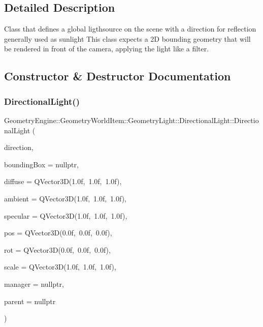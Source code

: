 \subsection{Detailed Description}
Class that defines a global ligthsource on the scene with a direction for reflection generally used as sunlight This class expects a 2D bounding geometry that will be rendered in front of the camera, applying the light like a filter. 

\subsection{Constructor \& Destructor Documentation}
\mbox{\label{class_geometry_engine_1_1_geometry_world_item_1_1_geometry_light_1_1_directional_light_ac85f53b0abb002ec8406755b9177cf53}} 
\subsubsection{\texorpdfstring{DirectionalLight()}{DirectionalLight()}\hspace{0.1cm}{\footnotesize\ttfamily [1/2]}}
{\footnotesize\ttfamily Geometry\+Engine\+::\+Geometry\+World\+Item\+::\+Geometry\+Light\+::\+Directional\+Light\+::\+Directional\+Light (\begin{DoxyParamCaption}\item[{const Q\+Vector3D \&}]{direction,  }\item[{\mbox{\hyperlink{class_geometry_engine_1_1_geometry_world_item_1_1_geometry_item_1_1_geometry_item}{Geometry\+Item\+::\+Geometry\+Item}} $\ast$}]{bounding\+Box = {\ttfamily nullptr},  }\item[{const Q\+Vector3D \&}]{diffuse = {\ttfamily QVector3D(1.0f,~1.0f,~1.0f)},  }\item[{const Q\+Vector3D \&}]{ambient = {\ttfamily QVector3D(1.0f,~1.0f,~1.0f)},  }\item[{const Q\+Vector3D \&}]{specular = {\ttfamily QVector3D(1.0f,~1.0f,~1.0f)},  }\item[{const Q\+Vector3D \&}]{pos = {\ttfamily QVector3D(0.0f,~0.0f,~0.0f)},  }\item[{const Q\+Vector3D \&}]{rot = {\ttfamily QVector3D(0.0f,~0.0f,~0.0f)},  }\item[{const Q\+Vector3D \&}]{scale = {\ttfamily QVector3D(1.0f,~1.0f,~1.0f)},  }\item[{const \mbox{\hyperlink{class_geometry_engine_1_1_light_utils_1_1_light_component_manager}{Light\+Utils\+::\+Light\+Component\+Manager}} $\ast$const}]{manager = {\ttfamily nullptr},  }\item[{\mbox{\hyperlink{class_geometry_engine_1_1_geometry_world_item_1_1_world_item}{World\+Item}} $\ast$}]{parent = {\ttfamily nullptr} }\end{DoxyParamCaption})}

